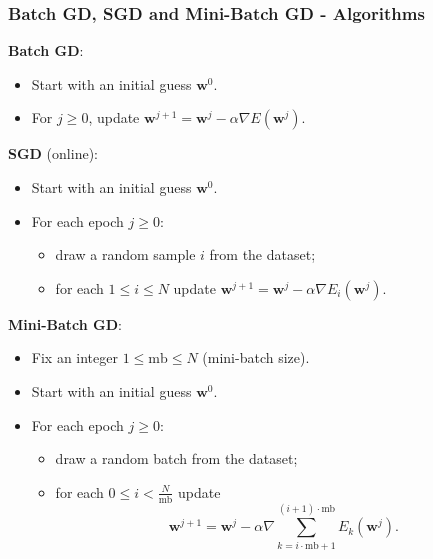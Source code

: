 \documentclass{beamer}
\begin{document}
	\begin{frame}
		\frametitle{Batch GD, SGD and Mini-Batch GD - Algorithms}
		
		
		\textbf{Batch GD}:
		\begin{itemize}
			\item Start with an initial guess $\bm{w}^0$.
			\item For $j \geq 0$, update $\bm{w}^{j+1} = \bm{w}^{j} - \alpha \nabla E(\bm{w}^j)$.
		\end{itemize}
		
		\textbf{SGD} (online):
		\begin{itemize}
			\item Start with an initial guess $\bm{w}^0$.
			\item For each epoch $j \geq 0$:
			\begin{itemize}
				\item draw a random sample $i$ from the dataset;
				\item for each $1\leq i \leq N$ update $\bm{w}^{j+1} = \bm{w}^j - \alpha \nabla E_i(\bm{w}^j)$.
			\end{itemize}
		\end{itemize}
	
		\textbf{Mini-Batch GD}:
		\begin{itemize}
			\item Fix an integer $1 \leq \text{mb} \leq N$ (mini-batch size).
			\item Start with an initial guess $\bm{w}^0$.
			\item For each epoch $j \geq 0$:
			\begin{itemize}
				\item draw a random batch from the dataset;
				\item for each $0 \leq i < \frac{N}{\text{mb}}$ update
				\begin{equation*}
					\bm{w}^{j+1} = \bm{w}^j - \alpha \nabla \sum_{k=i\cdot\text{mb} + 1}^{(i+1)\cdot\text{mb}}E_k(\bm{w}^j).
				\end{equation*}
			\end{itemize} 
		\end{itemize}
		
	\end{frame}
\end{document}
